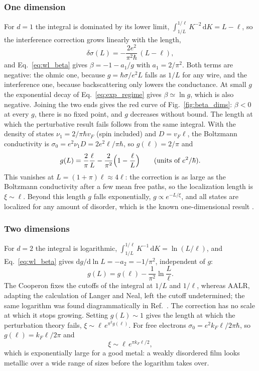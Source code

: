 \subsubsection*{One dimension}

For $d=1$ the integral is dominated by its lower limit, $\int_{1/L}^{1/\ell}K^{-2}\,\mathrm{d}K=L-\ell$, so the interference correction grows linearly with the length,
\[
\delta\sigma(L)=-\frac{2e^2}{\pi^2\hbar}\,(L-\ell),
\]
and Eq.~\eqref{eq:wl_beta} gives $\beta=-1-a_1/g$ with $a_1=2/\pi^2$. Both terms are negative: the ohmic one, because $g=\hbar\sigma/e^2L$ falls as $1/L$ for any wire, and the interference one, because backscattering only lowers the conductance. At small $g$ the exponential decay of Eq.~\eqref{eq:exp_regime} gives $\beta\simeq\ln g$, which is also negative. Joining the two ends gives the red curve of Fig.~\ref{fig:beta_dims}: $\beta<0$ at every $g$, there is no fixed point, and $g$ decreases without bound.
The length at which the perturbative result fails follows from the same integral. With the density of states $\nu_1=2/\pi\hbar v_F$ (spin included) and $D=v_F\ell$, the Boltzmann conductivity is $\sigma_0=e^2\nu_1D=2e^2\ell/\pi\hbar$, so $g(\ell)=2/\pi$ and
\[
g(L)=\frac{2}{\pi}\frac{\ell}{L}-\frac{2}{\pi^2}\Bigl(1-\frac{\ell}{L}\Bigr)\qquad(\text{units of }e^2/\hbar).
\]
This vanishes at $L=(1+\pi)\ell\approx4\ell$: the correction is as large as the Boltzmann conductivity after a few mean free paths, so the localization length is $\xi\sim\ell$. Beyond this length $g$ falls exponentially, $g\propto e^{-L/\xi}$, and all states are localized for any amount of disorder, which is the known one-dimensional result \cite{Mott01041961,LeeRamakrishnan1985}.

\subsubsection*{Two dimensions}

For $d=2$ the integral is logarithmic, $\int_{1/L}^{1/\ell}K^{-1}\,\mathrm{d}K=\ln(L/\ell)$, and Eq.~\eqref{eq:wl_beta} gives $\mathrm{d}g/\mathrm{d}\ln L=-a_2=-1/\pi^2$, independent of $g$:
\[
g(L)=g(\ell)-\frac1{\pi^2}\ln\frac{L}{\ell}.
\]
The Cooperon fixes the cutoffs of the integral at $1/L$ and $1/\ell$, whereas AALR, adapting the calculation of Langer and Neal, left the cutoff undetermined; the same logarithm was found diagrammatically in Ref.~\cite{GLK1979}. The correction has no scale at which it stops growing. Setting $g(L)\sim1$ gives the length at which the perturbation theory fails, $\xi\sim\ell\,e^{\pi^2g(\ell)}$. For free electrons $\sigma_0=e^2k_F\ell/2\pi\hbar$, so $g(\ell)=k_F\ell/2\pi$ and
\[
\xi\sim\ell\,e^{\pi k_F\ell/2},
\]
which is exponentially large for a good metal: a weakly disordered film looks metallic over a wide range of sizes before the logarithm takes over.

